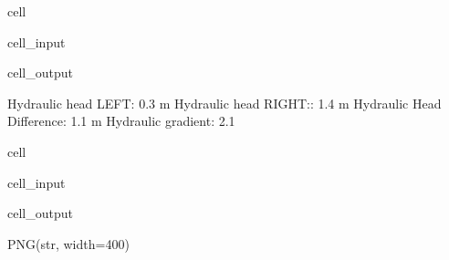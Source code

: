\documentclass[letterpaper,10pt,english]{jupyterBook}
\begin{document}
\begin{sphinxuseclass}{cell}
\begin{sphinxVerbatimInput}
\begin{sphinxuseclass}{cell_input}
\end{sphinxuseclass}\end{sphinxVerbatimInput}
\begin{sphinxVerbatimOutput}

\begin{sphinxuseclass}{cell_output}
\begin{sphinxVerbatim}[commandchars=\\\{\}]
Hydraulic head LEFT: 0.3 m
Hydraulic head RIGHT:: 1.4 m
Hydraulic Head Difference: 1.1 m
Hydraulic gradient: 2.1
\end{sphinxVerbatim}

\end{sphinxuseclass}\end{sphinxVerbatimOutput}

\end{sphinxuseclass}
\begin{sphinxuseclass}{cell}\begin{sphinxVerbatimInput}

\begin{sphinxuseclass}{cell_input}
\begin{sphinxVerbatim}[commandchars=\\\{\}]
   
\end{sphinxVerbatim}

\end{sphinxuseclass}\end{sphinxVerbatimInput}
\begin{sphinxVerbatimOutput}

\begin{sphinxuseclass}{cell_output}
\begin{sphinxVerbatim}[commandchars=\\\{\}]
PNG(str, width=400)
\end{sphinxVerbatim}

\end{sphinxuseclass}\end{sphinxVerbatimOutput}

\end{sphinxuseclass}
\end{document}

